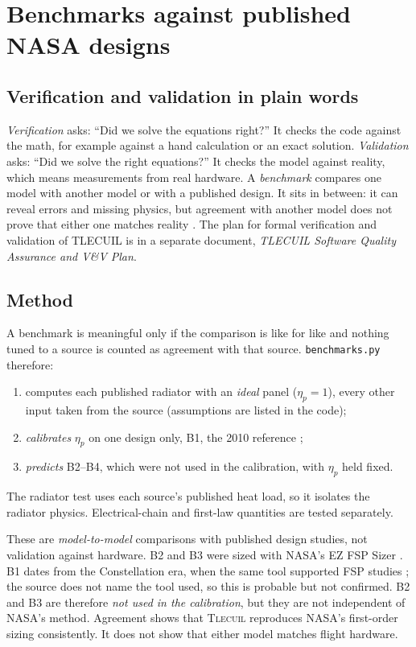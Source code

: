 \documentclass[11pt]{article}
\numberwithin{equation}{section}
\numberwithin{table}{section}
\newcommand{\tlecuil}{\textsc{Tlecuil}}
\begin{document}
\section{Benchmarks against published NASA designs}\label{sec:bench}

\subsection{Verification and validation in plain words}
\emph{Verification} asks: ``Did we solve the equations right?'' It checks the code
against the math, for example against a hand calculation or an exact solution.
\emph{Validation} asks: ``Did we solve the right equations?'' It checks the model
against reality, which means measurements from real hardware. A \emph{benchmark}
compares one model with another model or with a published design. It sits in between:
it can reveal errors and missing physics, but agreement with another model does not
prove that either one matches reality \cite{oberkampf2010vv}. The plan for formal
verification and validation of TLECUIL is in a separate document,
\emph{TLECUIL Software Quality Assurance and V\&V Plan}.

\subsection{Method}
A benchmark is meaningful only if the comparison is like for like and nothing tuned
to a source is counted as agreement with that source. \texttt{benchmarks.py}
therefore:
\begin{enumerate}
  \item computes each published radiator with an \emph{ideal} panel ($\eta_p=1$), every
        other input taken from the source (assumptions are listed in the code);
  \item \emph{calibrates} $\eta_p$ on one design only, B1, the 2010 reference
        \cite{fsp2010icd,mason2011arch};
  \item \emph{predicts} B2--B4, which were not used in the calibration, with $\eta_p$ held fixed.
\end{enumerate}
The radiator test uses each source's published heat load, so it isolates the radiator
physics. Electrical-chain and first-law quantities are tested separately.

\begin{review}
These are \emph{model-to-model} comparisons with published design studies, not
validation against hardware. B2 and B3 were sized with NASA's EZ FSP Sizer
\cite{mason2025trades}. B1 dates from the Constellation era, when the same tool
supported FSP studies \cite{mason2025trades}; the source does not name the tool used,
so this is probable but not confirmed. B2 and B3 are therefore \emph{not used in the
calibration}, but they are not independent of NASA's method. Agreement shows that
\tlecuil{} reproduces NASA's first-order sizing consistently. It does not show that
either model matches flight hardware.
\end{review}
\end{document}
